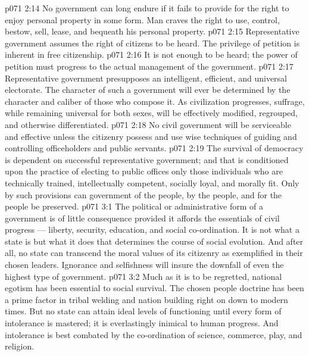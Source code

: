 \vs p071 2:14 \pc {}\bibnobreakspace {} No government can long endure if it fails to provide for the right to enjoy personal property in some form. Man craves the right to use, control, bestow, sell, lease, and bequeath his personal property.
\vs p071 2:15 \pc {}\bibnobreakspace {} Representative government assumes the right of citizens to be heard. The privilege of petition is inherent in free citizenship.
\vs p071 2:16 \pc {}\bibnobreakspace {} It is not enough to be heard; the power of petition must progress to the actual management of the government.
\vs p071 2:17 \pc {}\bibnobreakspace {} Representative government presupposes an intelligent, efficient, and universal electorate. The character of such a government will ever be determined by the character and caliber of those who compose it. As civilization progresses, suffrage, while remaining universal for both sexes, will be effectively modified, regrouped, and otherwise differentiated.
\vs p071 2:18 \pc {}\bibnobreakspace {} No civil government will be serviceable and effective unless the citizenry possess and use wise techniques of guiding and controlling officeholders and public servants.
\vs p071 2:19 \pc {}\bibnobreakspace {} The survival of democracy is dependent on successful representative government; and that is conditioned upon the practice of electing to public offices only those individuals who are technically trained, intellectually competent, socially loyal, and morally fit. Only by such provisions can government of the people, by the people, and for the people be preserved.
\vs p071 3:1 The political or administrative form of a government is of little consequence provided it affords the essentials of civil progress --- liberty, security, education, and social co\hyp{}ordination. It is not what a state is but what it does that determines the course of social evolution. And after all, no state can transcend the moral values of its citizenry as exemplified in their chosen leaders. Ignorance and selfishness will insure the downfall of even the highest type of government.
\vs p071 3:2 Much as it is to be regretted, national egotism has been essential to social survival. The chosen people doctrine has been a prime factor in tribal welding and nation building right on down to modern times. But no state can attain ideal levels of functioning until every form of intolerance is mastered; it is everlastingly inimical to human progress. And intolerance is best combated by the co\hyp{}ordination of science, commerce, play, and religion.
